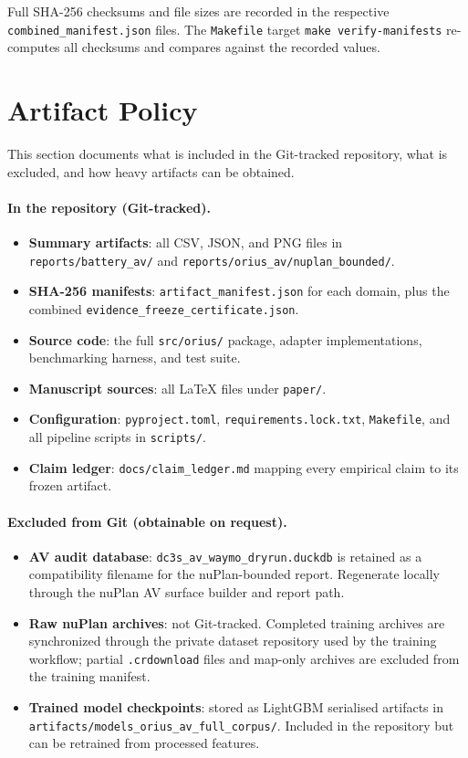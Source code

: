 Full SHA-256 checksums and file sizes are recorded in the respective
\texttt{combined\_manifest.json} files.  The \texttt{Makefile} target
\texttt{make verify-manifests} re-computes all checksums and compares against the
recorded values.

\section{Artifact Policy}\label{app:artifact_policy}

This section documents what is included in the Git-tracked repository, what is
excluded, and how heavy artifacts can be obtained.

\paragraph{In the repository (Git-tracked).}
\begin{itemize}[nosep]
  \item \textbf{Summary artifacts}: all CSV, JSON, and PNG files in
        \texttt{reports/battery\_av/} and \texttt{reports/orius\_av/nuplan\_bounded/}.
  \item \textbf{SHA-256 manifests}: \texttt{artifact\_manifest.json} for each domain,
        plus the combined \texttt{evidence\_freeze\_certificate.json}.
  \item \textbf{Source code}: the full \texttt{src/orius/} package, adapter
        implementations, benchmarking harness, and test suite.
  \item \textbf{Manuscript sources}: all \LaTeX{} files under \texttt{paper/}.
  \item \textbf{Configuration}: \texttt{pyproject.toml}, \texttt{requirements.lock.txt},
        \texttt{Makefile}, and all pipeline scripts in \texttt{scripts/}.
  \item \textbf{Claim ledger}: \texttt{docs/claim\_ledger.md} mapping every
        empirical claim to its frozen artifact.
\end{itemize}

\paragraph{Excluded from Git (obtainable on request).}
\begin{itemize}[nosep]
  \item \textbf{AV audit database}: \texttt{dc3s\_av\_waymo\_dryrun.duckdb}
        is retained as a compatibility filename for the nuPlan-bounded report.
        Regenerate locally through the nuPlan AV surface builder and report path.
  \item \textbf{Raw nuPlan archives}: not Git-tracked. Completed training archives
        are synchronized through the private dataset repository used by the training
        workflow; partial \texttt{.crdownload} files and map-only archives are
        excluded from the training manifest.
  \item \textbf{Trained model checkpoints}: stored as LightGBM serialised
        artifacts in \texttt{artifacts/models\_orius\_av\_full\_corpus/}.
        Included in the repository but can be retrained from processed features.
\end{itemize}

